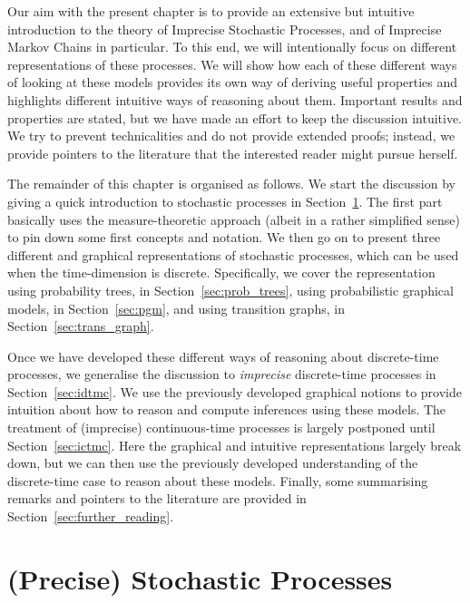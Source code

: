 \documentclass[graybox]{svmult}
\begin{document}
Our aim with the present chapter is to provide an extensive but intuitive introduction to the theory of Imprecise Stochastic Processes, and of Imprecise Markov Chains in particular. To this end, we will intentionally focus on different representations of these processes. We will show how each of these different ways of looking at these models provides its own way of deriving useful properties and highlights different intuitive ways of reasoning about them. Important results and properties are stated, but we have made an effort to keep the discussion intuitive. We try to prevent technicalities and do not provide extended proofs; instead, we provide pointers to the literature that the interested reader might pursue herself.

The remainder of this chapter is organised as follows. We start the discussion by giving a quick introduction to stochastic processes in Section~\ref{sec:prec_stoch_proc}. The first part basically uses the measure-theoretic approach (albeit in a rather simplified sense) to pin down some first concepts and notation. We then go on to present three different and graphical representations of stochastic processes, which can be used when the time-dimension is discrete. Specifically, we cover the representation using probability trees, in Section~\ref{sec:prob_trees}, using probabilistic graphical models, in Section~\ref{sec:pgm}, and using transition graphs, in Section~\ref{sec:trans_graph}.

Once we have developed these different ways of reasoning about discrete-time processes, we generalise the discussion to \emph{imprecise} discrete-time processes in Section~\ref{sec:idtmc}. We use the previously developed graphical notions to provide intuition about how to reason and compute inferences using these models. The treatment of (imprecise) continuous-time processes is largely postponed until Section~\ref{sec:ictmc}. Here the graphical and intuitive representations largely break down, but we can then use the previously developed understanding of the discrete-time case to reason about these models. Finally, some summarising remarks and pointers to the literature are provided in Section~\ref{sec:further_reading}.

\section{(Precise) Stochastic Processes}\label{sec:prec_stoch_proc}

\end{document}
